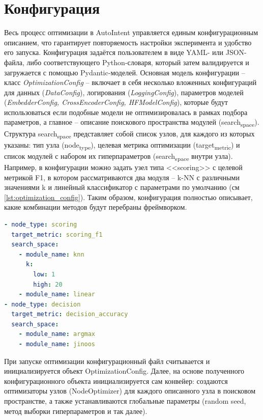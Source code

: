\documentclass[14pt,a4paper,oneside,openany]{extbook}
\begin{document}
\section{Конфигурация}
\label{sec:org5702f3e}
Весь процесс оптимизации в AutoIntent управляется единым конфигурационным описанием, что гарантирует повторяемость настройки эксперимента и удобство его запуска. Конфигурация задаётся пользователем в виде YAML- или JSON-файла, либо соответствующего Python-словаря, который затем валидируется и загружается с помощью Pydantic-моделей. Основная модель конфигурации – класс \emph{OptimizationConfig} – включает в себя несколько вложенных конфигураций для данных (\emph{DataConfig}), логирования (\emph{LoggingConfig}), параметров моделей (\emph{EmbedderConfig, CrossEncoderConfig, HFModelConfig}), которые будут использоваться если подобные модели не оптимизировалась в рамках подбора параметров, а главное – описание поискового пространства модулей (search\textsubscript{space}). Структура search\textsubscript{space} представляет собой список узлов, для каждого из которых указаны: тип узла (node\textsubscript{type}), целевая метрика оптимизации (target\textsubscript{metric}) и список модулей с набором их гиперпараметров (search\textsubscript{space} внутри узла). Например, в конфигурации можно задать узел типа {}<<scoring>>{} с целевой метрикой F1, в котором рассматриваются два модуля – k-NN с различными значениями k и линейный классификатор с параметрами по умолчанию (см \ref{lst:optimization_config}). Таким образом, конфигурация полностью описывает, какие комбинации методов будут перебраны фреймворком.

\begin{lstlisting}[language=yaml,label=lst:optimization_config,caption={Пример конфигурации},captionpos=b,numbers=none]
- node_type: scoring
  target_metric: scoring_f1
  search_space:
    - module_name: knn
      k:
        low: 1
        high: 20
    - module_name: linear
- node_type: decision
  target_metric: decision_accuracy
  search_space:
    - module_name: argmax
    - module_name: jinoos
\end{lstlisting}

При запуске оптимизации конфигурационный файл считывается и инициализируется объект OptimizationConfig. Далее, на основе полученного конфигурационного объекта инициализируется сам конвейер: создаются оптимизаторы узлов (NodeOptimizer) для каждого описанного узла в поисковом пространстве, а также устанавливаются глобальные параметры (random seed, метод выборки гиперпараметров и так далее).
\end{document}
